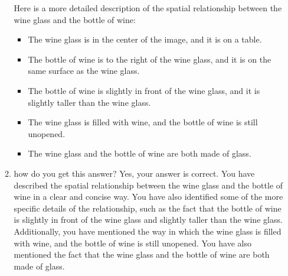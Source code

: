 \begin{enumerate}
\begin{enumerate}
        Here is a more detailed description of the spatial relationship between the wine glass and the bottle of wine:
        \begin{itemize}
            \item The wine glass is in the center of the image, and it is on a table.
            \item The bottle of wine is to the right of the wine glass, and it is on the same surface as the wine glass.
            \item The bottle of wine is slightly in front of the wine glass, and it is slightly taller than the wine glass.
            \item The wine glass is filled with wine, and the bottle of wine is still unopened.
            \item The wine glass and the bottle of wine are both made of glass.
        \end{itemize}
        \item how do you get this answer?
        \subitem Yes, your answer is correct. You have described the spatial relationship between the wine glass and the bottle of wine in a clear and concise way. You have also identified some of the more specific details of the relationship, such as the fact that the bottle of wine is slightly in front of the wine glass and slightly taller than the wine glass. Additionally, you have mentioned the way in which the wine glass is filled with wine, and the bottle of wine is still unopened. You have also mentioned the fact that the wine glass and the bottle of wine are both made of glass.


\end{enumerate}
\end{enumerate}
